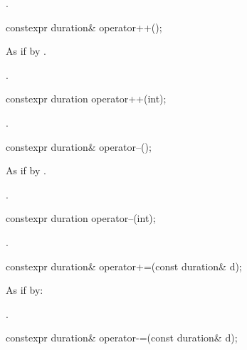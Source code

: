 \begin{itemdescr}
\pnum
\returns
{}.
\end{itemdescr}

%
\begin{itemdecl}
constexpr duration& operator++();
\end{itemdecl}

\begin{itemdescr}
\pnum
\effects
As if by .

\pnum
\returns
{}.
\end{itemdescr}

%
\begin{itemdecl}
constexpr duration operator++(int);
\end{itemdecl}

\begin{itemdescr}
\pnum
\returns
{}.
\end{itemdescr}

%
\begin{itemdecl}
constexpr duration& operator--();
\end{itemdecl}

\begin{itemdescr}
\pnum
\effects
As if by .

\pnum
\returns
{}.
\end{itemdescr}

%
\begin{itemdecl}
constexpr duration operator--(int);
\end{itemdecl}

\begin{itemdescr}
\pnum
\returns
{}.
\end{itemdescr}

%
\begin{itemdecl}
constexpr duration& operator+=(const duration& d);
\end{itemdecl}

\begin{itemdescr}
\pnum
\effects
As if by: 

\pnum
\returns
{}.
\end{itemdescr}

%
\begin{itemdecl}
constexpr duration& operator-=(const duration& d);
\end{itemdecl}

